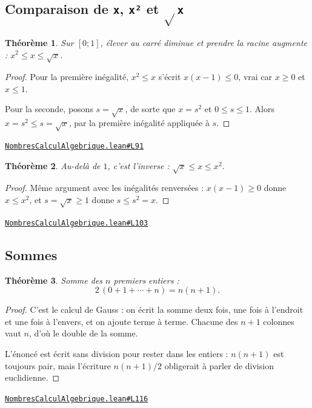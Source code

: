 \documentclass[11pt,a4paper]{article}
\theoremstyle{definition}
\theoremstyle{plain}
\newtheorem{theoreme}{Théorème}
\newcommand{\source}[2]{\par\smallskip\noindent\hfill{\footnotesize\href{#1}{\texttt{#2}}}\par\smallskip}
\begin{document}
\subsection{Comparaison de \texttt{x}, \texttt{x²} et \texttt{\(\sqrt{}\)x}}

\begin{theoreme}
Sur $[0 ; 1]$, élever au carré diminue et prendre la racine augmente :
$x^2 \le x \le \sqrt x$.
\end{theoreme}

\begin{proof}
Pour la première inégalité, $x^2 \le x$ s'écrit $x(x - 1) \le 0$, vrai car $x \ge 0$ et
$x \le 1$.

Pour la seconde, posons $s = \sqrt x$, de sorte que $x = s^2$ et $0 \le s \le 1$. Alors
$x = s^2 \le s = \sqrt x$, par la première inégalité appliquée à $s$.
\end{proof}
\source{https://github.com/Commutator-IO/learn-lean/blob/main/cours/02-lycee/01-nombres-calcul-algebrique/NombresCalculAlgebrique.lean\#L91}{NombresCalculAlgebrique.lean\#L91}

\begin{theoreme}
Au-delà de $1$, c'est l'inverse : $\sqrt x \le x \le x^2$.
\end{theoreme}

\begin{proof}
Même argument avec les inégalités renversées : $x(x-1) \ge 0$ donne $x \le x^2$, et
$s = \sqrt x \ge 1$ donne $s \le s^2 = x$.
\end{proof}
\source{https://github.com/Commutator-IO/learn-lean/blob/main/cours/02-lycee/01-nombres-calcul-algebrique/NombresCalculAlgebrique.lean\#L103}{NombresCalculAlgebrique.lean\#L103}

\subsection{Sommes}

\begin{theoreme}
Somme des $n$ premiers entiers :
\[ 2\,(0 + 1 + \cdots + n) = n(n+1) . \]
\end{theoreme}

\begin{proof}
C'est le calcul de Gauss : on écrit la somme deux fois, une fois à l'endroit et une fois
à l'envers, et on ajoute terme à terme. Chacune des $n+1$ colonnes vaut $n$, d'où le
double de la somme.

L'énoncé est écrit sans division pour rester dans les entiers : $n(n+1)$ est toujours
pair, mais l'écriture $n(n+1)/2$ obligerait à parler de division euclidienne.
\end{proof}
\source{https://github.com/Commutator-IO/learn-lean/blob/main/cours/02-lycee/01-nombres-calcul-algebrique/NombresCalculAlgebrique.lean\#L116}{NombresCalculAlgebrique.lean\#L116}
\end{document}

